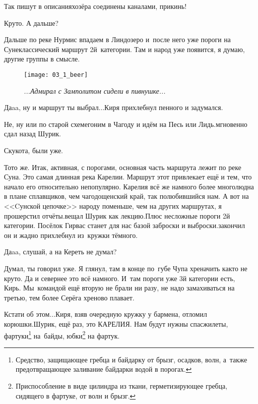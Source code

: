 \diagdash Так пишут в описаниях\mdash озёра соединены каналами, прикинь!

\diagdash Круто. А дальше? 

\diagdash Дальше по реке Нурмис впадаем в Линдозеро и~после него уже пороги на Суне\mdash классический маршрут 2\sdash й~категории. Там и народ уже появится, я думаю, другие группы в смысле.

	\begin{figure}[h]
	\centering
	\texttt{[image: 03\_1\_beer]}
	\caption{\small\textit{...Адмирал с Замполитом сидели в пивнушке...}}
	\end{figure}

\diagdash Да\sdash a\sdash a, ну и маршрут ты выбрал$\ldots$\mdash Киря прихлебнул пенного и задумался.

\diagdash Не, ну или по старой схеме\mdash гоним в Чагоду и идём на Песь или Лидь.\mdash мгновенно сдал назад Шурик.

\diagdash Скукота, были уже.

\diagdash То\sdash то же. Итак, активная, с порогами, основная часть маршрута лежит по реке Суна. Это самая длинная река Карелии. Маршрут этот привлекает ещё и тем, что начало его относительно непопулярно. Карелия всё же намного более многолюдна в плане сплавщиков, чем чагодощенский край, так полюбившийся нам. А вот на <<Cунской цепочке>> народу поменьше, чем на других маршрутах, я прошерстил отчёты.\mdash вещал Шурик как лекцию.\mdash Плюс несложные пороги 2\sdash й категории. Посёлок Гирвас станет для нас базой заброски и выброски.\mdash закончил он и жадно прихлебнул из~кружки тёмного.

\diagdash Да\sdash a\sdash a, слушай, а на Кереть не думал?

\diagdash Думал, ты говорил уже. Я глянул, там в конце по~губе Чупа хреначить как\sdash то не круто. Да и севернее это всё намного. И~там пороги уже 3\sdash й категории есть, Кирь. Мы~командой ещё вторую не брали ни разу, не надо замахиваться на третью, тем более Серёга хреново плавает. 

\renewcommand*{\thefootnote}{\arabic{footnote}}
\diagdash Кстати об этом$\ldots$\mdash Киря, взяв очередную кружку у бармена, отломил корюшки.\mdash Шурик, ещё раз, это КАРЕЛИЯ. Нам будут нужны спасжилеты, фартуки\footnote{Средство, защищающее гребца и байдарку от брызг, осадков, волн, а~также предотвращающее заливание байдарки водой в порогах.} на~байды, юбки\footnote{Приспособление в виде цилиндра из ткани, герметизирующее гребца, сидящего в фартуке, от волн и брызг.} на фартук.

